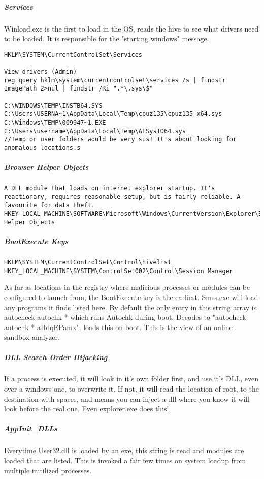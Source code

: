 \subparagraph{Services}
Winload.exe is the first to load in the OS, reads the hive to see what drivers need to be loaded. It is responsible for the "starting windows" message.
\begin{lstlisting}[label=RegistryServices,caption=Registry Service Locations]
HKLM\SYSTEM\CurrentControlSet\Services

View drivers (Admin)
reg query hklm\system\currentcontrolset\services /s | findstr ImagePath 2>nul | findstr /Ri ".*\.sys\$"

C:\WINDOWS\TEMP\INSTB64.SYS C:\Users\USERNA~1\AppData\Local\Temp\cpuz135\cpuz135_x64.sys C:\Windows\TEMP\009947~1.EXE C:\Users\username\AppData\Local\Temp\ALSysIO64.sys
//Temp or user folders would be very sus! It's about looking for anomalous locations.s
\end{lstlisting}


\subparagraph{Browser Helper Objects}
\begin{lstlisting}[label=RegistryBHO,caption=Registry BHO Locations]
A DLL module that loads on internet explorer startup. It's reactionary, requires reasonable setup, but is fairly reliable. A favourite for data theft.
HKEY_LOCAL_MACHINE\SOFTWARE\Microsoft\Windows\CurrentVersion\Explorer\Browser Helper Objects
\end{lstlisting}

\subparagraph{BootExecute Keys}
\begin{lstlisting}[label=RegistryBootExecute,caption=Registry BootExecute Locations]
HKLM\SYSTEM\CurrentControlSet\Control\hivelist
HKEY_LOCAL_MACHINE\SYSTEM\ControlSet002\Control\Session Manager
\end{lstlisting}

As far as locations in the registry where malicious processes or modules can be configured to launch from, the BootExecute key is the earliest. 
Smss.exe will load any programs it finds listed here. By default the only entry in this string array is autocheck autochk * which runs Autochk during boot.
Decodes to "autocheck autochk * aHdqEPamx", loads this on boot. This is the view of an online sandbox analyzer.

\subparagraph{DLL Search Order Hijacking}
If a process is executed, it will look in it's own folder first, and use it's DLL, even over a windows one, to overwrite it. If not, it will read the location of root, 
to the destination with spaces, and means you can inject a dll where you know it will look before the real one. Even explorer.exe does this!

\subparagraph{AppInit\_DLLs}
Everytime User32.dll is loaded by an exe, this string is read and modules are loaded that are listed. This is invoked a fair few times on system loadup from multiple initilized processes.

